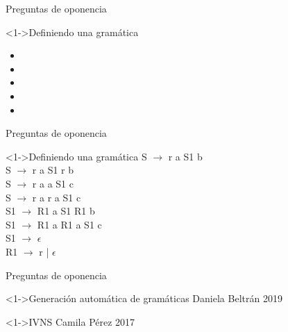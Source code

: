\begin{frame}{Preguntas de oponencia}
	\begin{block}<1->{Definiendo una gramática}
		\begin{itemize}
			\item {}
			\item {}
			\item {}
			\item {}			
			\item {}
		\end{itemize}
	\end{block}
	
\end{frame}

\begin{frame}{Preguntas de oponencia}
	\begin{block}<1->{Definiendo una gramática}
			S $\rightarrow$ r a S1 b\\
			S $\rightarrow$ r a S1 r b\\
			S $\rightarrow$ r a a S1 c\\
			S $\rightarrow$ r a r a S1 c\\
			S1 $\rightarrow$ R1 a S1 R1 b\\
			S1 $\rightarrow$ R1 a R1 a S1 c\\
			S1 $\rightarrow$ $\epsilon$\\
			R1 $\rightarrow$ r | $\epsilon$\\
	\end{block}
	
\end{frame}

\begin{frame}{Preguntas de oponencia}
	\begin{block}<1->{Generación automática de gramáticas}
		Daniela Beltrán 2019
	\end{block}

\begin{block}<1->{IVNS}
	Camila Pérez 2017
\end{block}
	
\end{frame}
